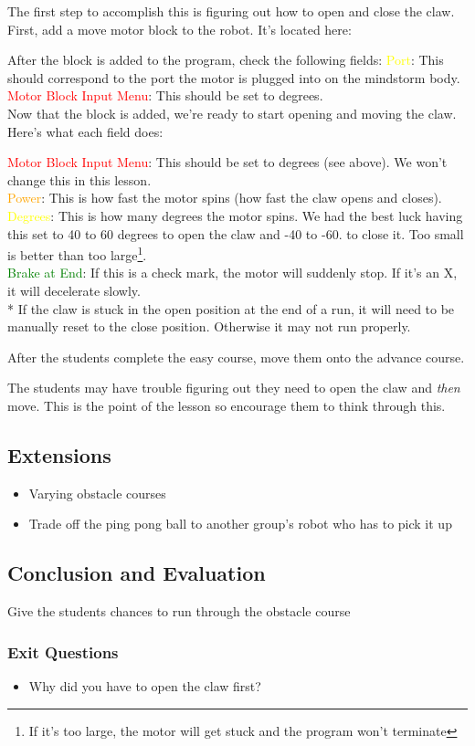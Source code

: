 \documentclass{lessonplan}
\begin{document}
The first step to accomplish this is figuring out how to open and close the claw. First, add a move motor block to the robot. It's located here:

After the block is added to the program, check the following fields:
\textcolor{yellow}{Port}: This should correspond to the port the motor is plugged into on the mindstorm body. \hfill\\
\textcolor{red}{Motor Block Input Menu}: This should be set to degrees. \hfill\\

Now that the block is added, we're ready to start opening and moving the claw. Here's what each field does:


\textcolor{red}{Motor Block Input Menu}: This should be set to degrees (see above). We won't change this in this lesson. \hfill\\
\textcolor{orange}{Power}: This is how fast the motor spins (how fast the claw opens and closes).\hfill\\
\textcolor{yellow}{Degrees}: This is how many degrees the motor spins. We had the best luck having this set to 40 to 60 degrees to open the claw and -40 to -60. to close it. Too small is better than too large\footnote{If it's too large, the motor will get stuck and the program won't terminate}. \hfill\\
\textcolor{green}{Brake at End}: If this is a check mark, the motor will suddenly stop. If it's an X, it will decelerate slowly. \hfill\\

* If the claw is stuck in the open position at the end of a run, it will need to be manually reset to the close position. Otherwise it may not run properly.

After the students complete the easy course, move them onto the advance course.

The students may have trouble figuring out they need to open the claw and \textit{then} move. This is the point of the lesson so encourage them to think through this.

\subsection{Extensions}
\begin{itemize}
	\item Varying obstacle courses
	\item Trade off the ping pong ball to another group's robot who has to pick it up
\end{itemize}
\subsection{Conclusion and Evaluation}
Give the students chances to run through the obstacle course
\subsubsection{Exit Questions}
\begin{itemize}
	\item Why did you have to open the claw first?
\end{itemize}
\end{document}
